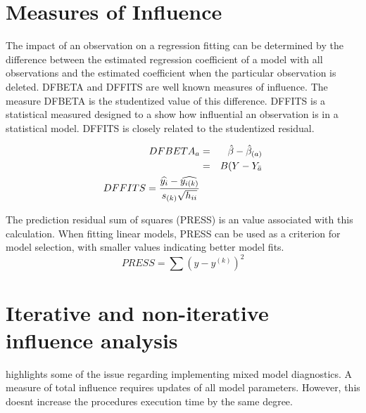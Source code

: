 \documentclass[12pt, a4paper]{report}
\theoremstyle{plain}
\theoremstyle{definition}
\theoremstyle{remark}
\begin{document}
\section{Measures of Influence} 

The impact of an observation on a regression fitting can be determined by the difference between the estimated regression coefficient of a model with all observations and the estimated coefficient when the particular observation is deleted. DFBETA and DFFITS are well known measures of influence. The measure DFBETA is the studentized value of this difference. DFFITS is a statistical measured designed to a show how influential an observation is in a statistical model. DFFITS is closely related to the studentized residual.

\begin{eqnarray}
DFBETA_{a} &=& \hat{\beta} - \hat{\beta}_{(a)} \\
&=& B(Y-Y_{\bar{a}}
\\ DFFITS = {\widehat{y_i} -
	\widehat{y_{i(k)}} \over s_{(k)} \sqrt{h_{ii}}} 
\end{eqnarray}

The prediction residual sum of squares (PRESS) is an value associated with this calculation. When fitting linear models, PRESS can be used as a criterion for model selection, with smaller values indicating better model fits.
\begin{displaymath}
PRESS = \sum(y-y^{(k)})^2
\end{displaymath}
%	
%	





	\section{Iterative and non-iterative influence analysis}
	\citet{schabenberger} highlights some of the issue regarding implementing mixed model diagnostics.
	A measure of total influence requires updates of all model parameters.
	However, this doesnt increase the procedures execution time by the same degree.
	
\end{document}
